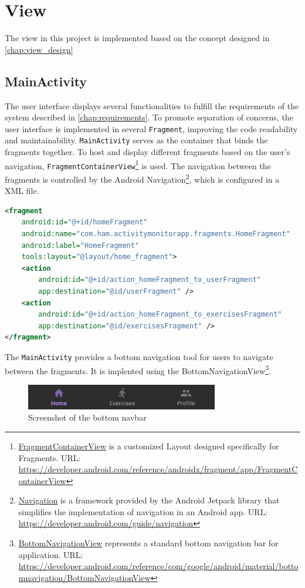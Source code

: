 \section{View}
\label{chap:view_impl}
The view in this project is implemented based on the concept designed in \autoref{chap:view_design}
\subsection{MainActivity}
The user interface displays several functionalities to fulfill the requirements of the system described in \autoref{chap:requirements}. To promote separation of concerns, the user interface is implemented in several \texttt{Fragment}, improving the code readability and maintainability.  
\texttt{MainActivity} serves as the container that binds the fragments together. To host and display different fragments based on the user's navigation, \texttt{FragmentContainerView}\footnote{\url{FragmentContainerView} is a customized Layout designed specifically for Fragments. URL: \url{https://developer.android.com/reference/androidx/fragment/app/FragmentContainerView}} is used.
The navigation between the fragments is controlled by the Android Navigation\footnote{\url{Navigation} is a framework provided by the Android Jetpack library that simplifies the implementation of navigation in an Android app. URL: \url{https://developer.android.com/guide/navigation}}, which is configured in a XML file. 
\begin{lstlisting}[caption={Navigation graph snippet for HomeFragment (XML - nav\_Graph)}, language=XML]
<fragment
    android:id="@+id/homeFragment"
    android:name="com.ham.activitymonitorapp.fragments.HomeFragment"
    android:label="HomeFragment"
    tools:layout="@layout/home_fragment">
    <action
        android:id="@+id/action_homeFragment_to_userFragment"
        app:destination="@id/userFragment" />
    <action
        android:id="@+id/action_homeFragment_to_exercisesFragment"
        app:destination="@id/exercisesFragment" />
</fragment>
\end{lstlisting}

The \texttt{MainActivity} provides a bottom navigation tool for users to navigate between the fragments. It is implented using the BottomNavigationView\footnote{\url{BottomNavigationView} represents a standard bottom navigation bar for application. URL: \url{https://developer.android.com/reference/com/google/android/material/bottomnavigation/BottomNavigationView}}.
\begin{figure}[H]
    \centering
    \includegraphics[width=0.75\textwidth]{images/bottom-navbar.png}
    \caption{Screenshot of the bottom navbar}
    \label{fig:bottom_navbar}
\end{figure}

